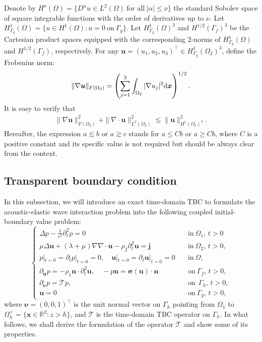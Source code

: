 \documentclass[final,leqno]{siamltex}
\begin{document}
Denote by $H^{\nu} (\Omega)= \{D^{\alpha} u \in L^2 (\Omega)~\text {for all}~
|\alpha| \leq \nu\}$ the standard Sobolev space of square integrable
functions with the order of derivatives up to $\nu$. Let $H^1_{\Gamma_g}
(\Omega)=\{ u\in H^1 (\Omega): u =0 ~\text {on}~\Gamma_g\}$. Let $H^1_{\Gamma_g}
(\Omega)^3$ and $H^{1/2} (\Gamma_f)^3$ be the Cartesian product spaces
equipped with the corresponding 2-norms of $H^1_{\Gamma_g} (\Omega)$ and
$H^{1/2} (\Gamma_f)$, respectively. For any $\boldsymbol u=(u_1, u_2,
u_3)^\top \in H^1_{\Gamma_g} (\Omega_2)^3$, define the Frobenius norm:
\[
\|\nabla {\boldsymbol u}\|_{F (\Omega_2)}= \left ( \sum \limits_{j=1}^3
\int_{\Omega_2}  |\nabla u_j |^2  {\rm d}  \boldsymbol  x  \right)^{1/2}.
\]
It is easy to verify that
\begin{align}\label{f1}
 \|\nabla \boldsymbol u\|^2_{F (\Omega_2)} +\|\nabla \cdot \boldsymbol
u\|^2_{L^2 (\Omega_2)} \lesssim \|\boldsymbol u\|^2_{H^1 (\Omega_2)^3}.
\end{align}
Hereafter, the expression $a \lesssim  b$ or $a\gtrsim c$ stands for $a \leq  C
b$ or $a\geq C b$, where $C$ is a positive constant and its specific value is
not required but should be always clear from the context.

\subsection{Transparent boundary condition}

In this subsection, we will introduce an exact time-domain TBC to formulate the
acoustic-elastic wave interaction problem into the following coupled
initial-boundary value problem:
\begin{equation}\label{rp}
 \begin{cases}
  \Delta p  - \frac{1}{c^2 } \partial_t^2  p =0 \quad  &\text{in}~
\Omega_1,\,t>0\\
  \mu \Delta \boldsymbol u +  (\lambda+\mu) \nabla \nabla \cdot \boldsymbol u
-\rho_2 \partial_t^2 \boldsymbol u =\boldsymbol j
  \quad  & \text {in}~  \Omega_2 ,\,t>0,\\
  p|_{t=0}=\partial_t p|_{t=0}=0,\quad \boldsymbol u|_{t=0}=\partial_{t}
\boldsymbol u|_{t=0}=0 \quad & \text {in}~\Omega,\\
\partial_{\boldsymbol n} p=-\rho_1 \boldsymbol n \cdot
\partial_t^2 \boldsymbol u, \quad -p \boldsymbol n = \boldsymbol \sigma
(\boldsymbol u) \cdot \boldsymbol  n\quad & \text {on}~\Gamma_f,\,t>0,\\
  \partial_{\boldsymbol \nu} p= \mathscr T p, \quad  &\text
{on}~~\Gamma_h,\,t>0,\\
  \boldsymbol u =0 \quad & \text {on}~ \Gamma_g,\,t>0,
 \end{cases}
 \end{equation}
where $ \boldsymbol  \nu=(0, 0, 1)^\top$ is the unit normal vector on $\Gamma_h$
pointing from $\Omega_1$ to $\Omega_h^+=\{\boldsymbol x\in\mathbb R^2: z>h\}$,
and $\mathscr T$ is the time-domain TBC operator on $\Gamma_h$. In
what follows, we shall derive the formulation of the operator $\mathscr T$ and
show some of its properties.
\end{document}
